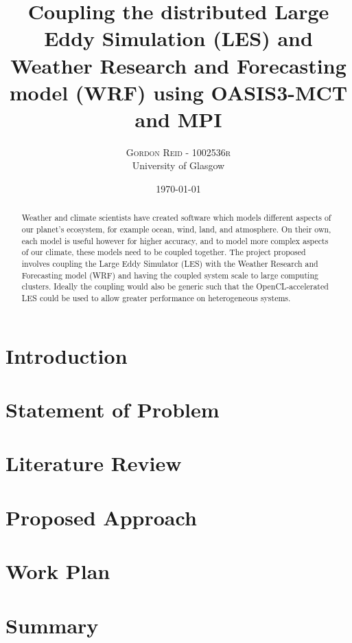 \documentclass[twoside]{article}
\title{Coupling the distributed Large Eddy Simulation (LES) and Weather
Research and Forecasting model (WRF) using OASIS3-MCT and MPI}
\author{
	\large
	\textsc{Gordon Reid - 1002536r}\\University of Glasgow
}
\date{\today}
\begin{document}
\maketitle
\thispagestyle{fancy}

\begin{abstract}

\noindent Weather and climate scientists have created software which models
different aspects of our planet's ecosystem, for example ocean, wind, land, and
atmosphere. On their own, each model is useful however for higher accuracy, and
to model more complex aspects of our climate, these models need to be coupled
together. The project proposed involves coupling the Large Eddy Simulator (LES)
with the Weather Research and Forecasting model (WRF) and having the coupled
system scale to large computing clusters. Ideally the coupling would also be
generic such that the OpenCL-accelerated LES could be used to allow greater
performance on heterogeneous systems.

\end{abstract}

\begin{multicols}{2}

\section*{Introduction}

\section*{Statement of Problem}

\section*{Literature Review}

\section*{Proposed Approach}

\section*{Work Plan}

\section*{Summary}




\end{multicols}
\end{document}
